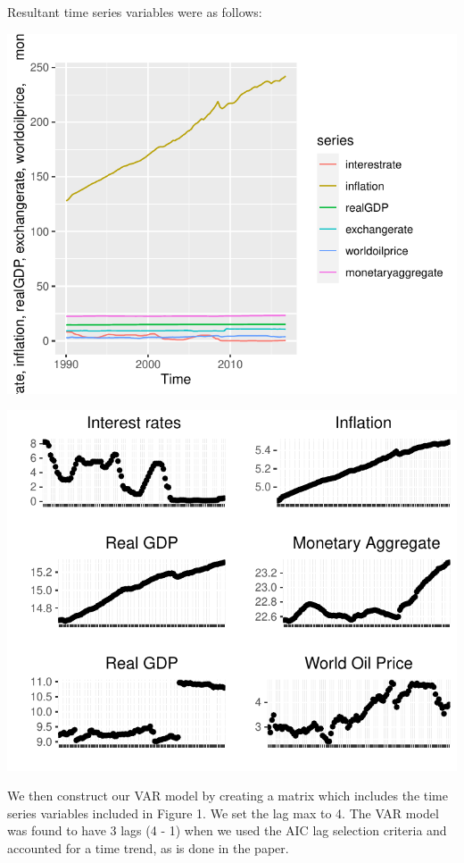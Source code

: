\documentclass[11pt,preprint, authoryear]{elsarticle}
\numberwithin{equation}{section}
\numberwithin{figure}{section}
\numberwithin{table}{section}
\begin{document}
Resultant time series variables were as follows:

\begin{center}\includegraphics{README_files/figure-latex/unnamed-chunk-1-1} \end{center}

\begin{center}\includegraphics{README_files/figure-latex/unnamed-chunk-2-1} \end{center}

We then construct our VAR model by creating a matrix which includes the
time series variables included in Figure 1. We set the lag max to 4. The
VAR model was found to have 3 lags (4 - 1) when we used the AIC lag
selection criteria and accounted for a time trend, as is done in the
paper.
\end{document}
